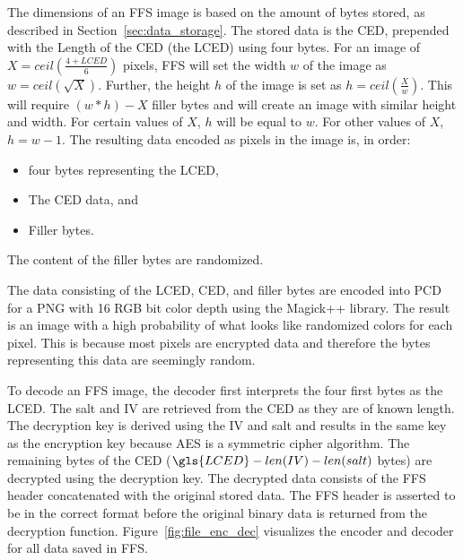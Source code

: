 The dimensions of an \gls{FFS} image is based on the amount of bytes stored, as described in Section~\ref{sec:data_storage}. The stored data is the CED, prepended with the Length of the \gls{CED} (the \gls{LCED}) using four bytes. For an image of $X = ceil(\frac{4 + LCED}{6})$ pixels, \gls{FFS} will set the width $w$ of the image as $w = ceil(\sqrt{X})$. Further, the height $h$ of the image is set as $h = ceil(\frac{X}{w})$. This will require $(w * h) - X$ filler bytes and will create an image with similar height and width. For certain values of $X$, $h$ will be equal to $w$. For other values of $X$, $h = w-1$. The resulting data encoded as pixels in the image is, in order:
\begin{itemize}
	\item four bytes representing the \gls{LCED},
	\item The \gls{CED} data, and
	\item Filler bytes.
\end{itemize}
The content of the filler bytes are randomized.

The data consisting of the \gls{LCED}, CED, and filler bytes are encoded into \gls{PCD} for a PNG with 16 \gls{RGB} bit color depth using the Magick++ library. The result is an image with a high probability of what looks like randomized colors for each pixel. This is because most pixels are encrypted data and therefore the bytes representing this data are seemingly random.

To decode an \gls{FFS} image, the decoder first interprets the four first bytes as the \gls{LCED}. The salt and \gls{IV} are retrieved from the \gls{CED} as they are of known length. The decryption key is derived using the \gls{IV} and salt and results in the same key as the encryption key because \gls{AES} is a symmetric cipher algorithm. The remaining bytes of the \gls{CED} ($\gls{LCED} - len(IV) - len(salt)$ bytes) are decrypted using the decryption key. The decrypted data consists of the \gls{FFS} header concatenated with the original stored data. The \gls{FFS} header is asserted to be in the correct format before the original binary data is returned from the decryption function. Figure~\ref{fig:file_enc_dec} visualizes the encoder and decoder for all data saved in \gls{FFS}.

